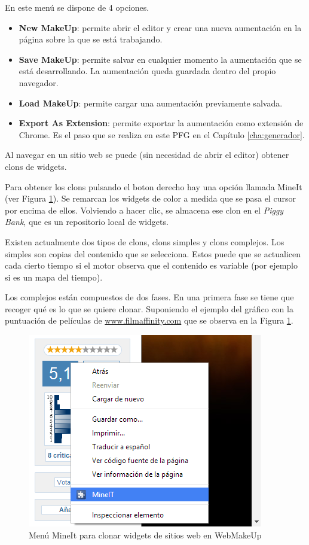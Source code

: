 En este menú se dispone de 4 opciones.
\begin{itemize}
\item{\textbf{New MakeUp}: permite abrir el editor y crear una nueva aumentación en la página sobre la que se está trabajando.}
\item{\textbf{Save MakeUp}: permite salvar en cualquier momento la aumentación que se está desarrollando. La aumentación queda guardada dentro del propio navegador.}
\item{\textbf{Load MakeUp}: permite cargar una aumentación previamente salvada.}
\item{\textbf{Export As Extension}: permite exportar la aumentación como extensión de Chrome. Es el paso que se realiza en este PFG en el Capítulo \ref{cha:generador}.}
\end{itemize}

Al navegar en un sitio web se puede (sin necesidad de abrir el editor) obtener clons de widgets.

Para obtener los clons pulsando el boton derecho hay una opción llamada MineIt (ver Figura \ref{fig:MenuMineIt}). Se remarcan los widgets de color a medida que se pasa el cursor por encima de ellos. Volviendo a hacer clic, se almacena ese clon en el \emph{Piggy Bank}, que es un repositorio local de widgets.

Existen actualmente dos tipos de clons, clons simples y clons complejos. Los simples son copias del contenido que se selecciona. Estos puede que se actualicen cada cierto tiempo si el motor observa que el contenido es variable (por ejemplo si es un mapa del tiempo). 

Los complejos están compuestos de dos fases. En una primera fase se tiene que recoger qué es lo que se quiere clonar. Suponiendo el ejemplo del gráfico con la puntuación de películas de \url{www.filmaffinity.com} que se observa en la Figura \ref{fig:MenuMineIt}.

\begin{figure}
\centering
\includegraphics[width=0.45\linewidth]{./figs/A-MenuMineIt}
\caption{Menú MineIt para clonar widgets de sitios web en WebMakeUp}
\label{fig:MenuMineIt}
\end{figure}

